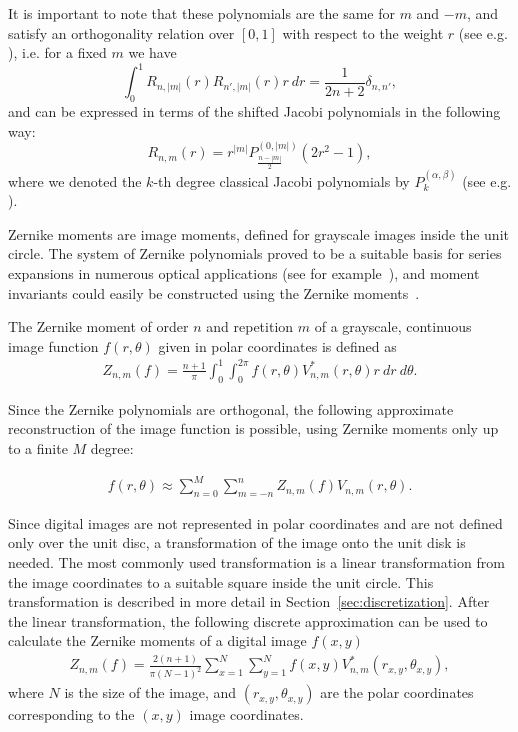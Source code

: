 It is important to note that these polynomials are the same for $m$ and $-m$, and satisfy an orthogonality relation over $[0,1]$ with respect to the weight $r$ (see e.g. \cite{schipp}), i.e. for a fixed $m$ we have
\begin{equation}\label{Rortho}
	\int_0^1 R_{n,|m|}(r) R_{n',|m|}(r)r\ dr  = \frac{1}{2n+2} \delta_{n,n'},
\end{equation}
and can be expressed in terms of the shifted Jacobi polynomials in the following way:
\begin{equation}\label{RJacobi}
	R_{n,m}(r) = r^{|m|} P_{\frac{n - |m|}{2}}^{(0,|m|)}(2r^2-1),
\end{equation}
where we denoted the $k$-th degree classical Jacobi polynomials by $P_k^{(\alpha,\beta)}$ (see e.g. \cite{Szego}).


Zernike moments are image moments, defined for grayscale images inside the unit circle.
The system of Zernike polynomials proved to be a suitable basis for series expansions in numerous optical applications (see for example~\cite{wavefront,optical_human_eye,opt_surf}), and moment invariants could easily be constructed using the Zernike moments~\cite{zernike_moments}. 

The Zernike moment of order $n$ and repetition $m$ of a grayscale, continuous image function $f(r,\theta)$ given in polar coordinates is defined as
\begin{gather*}
  Z_{n,m}(f) = \frac{n + 1}{\pi}\int_0^1\int_0^{2\pi}f(r,\theta)V_{n,m}^{*}(r,\theta)r\ dr\ d\theta.
\end{gather*}

Since the Zernike polynomials are orthogonal, the following approximate reconstruction of the image function is possible, using Zernike moments only up to a finite $M$ degree:

\begin{gather*}
  f(r,\theta) \approx \sum_{n=0}^{M}\sum_{m=-n}^{n}Z_{n,m}(f)V_{n,m}(r,\theta).
\end{gather*}

Since digital images are not represented in polar coordinates and are not defined only over the unit disc, a transformation of the image onto the unit disk is needed. The most commonly used transformation is a linear transformation from the image coordinates to a suitable square inside the unit circle. This transformation is described in more detail in Section~\ref{sec:discretization}.
After the linear transformation, the following discrete approximation can be used to calculate the Zernike moments of a digital image $f(x,y)$
\begin{gather*}
  Z_{n,m}(f) = \frac{2(n+1)}{\pi(N-1)^2}\sum_{x=1}^{N}\sum_{y=1}^{N}f(x,y)V_{n,m}^{*}(r_{x,y},\theta_{x,y}),
\end{gather*}
where $N$ is the size of the image, and $(r_{x,y},\theta_{x,y})$ are the polar coordinates corresponding to the $(x,y)$ image coordinates.

